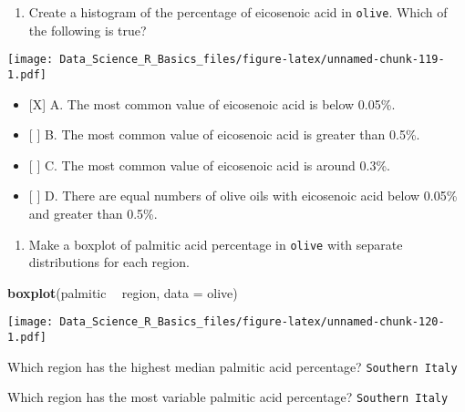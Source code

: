 \documentclass[]{article}
\newenvironment{Shaded}{\begin{snugshade}}{\end{snugshade}}
\newcommand{\DataTypeTok}[1]{\textcolor[rgb]{0.13,0.29,0.53}{#1}}
\newcommand{\KeywordTok}[1]{\textcolor[rgb]{0.13,0.29,0.53}{\textbf{#1}}}
\newcommand{\NormalTok}[1]{#1}
\newcommand{\OperatorTok}[1]{\textcolor[rgb]{0.81,0.36,0.00}{\textbf{#1}}}
\newcommand{\StringTok}[1]{\textcolor[rgb]{0.31,0.60,0.02}{#1}}
\providecommand{\tightlist}{%
  \setlength{\itemsep}{0pt}\setlength{\parskip}{0pt}}
\begin{document}
\begin{enumerate}
\def\labelenumi{\arabic{enumi}.}
\setcounter{enumi}{8}
\tightlist
\item
  Create a histogram of the percentage of eicosenoic acid in
  \texttt{olive}. Which of the following is true?
\end{enumerate}

\begin{Shaded}
\end{Shaded}

\texttt{[image: Data\_Science\_R\_Basics\_files/figure-latex/unnamed-chunk-119-1.pdf]}

\begin{itemize}
\tightlist
\item
  {[}X{]} A. The most common value of eicosenoic acid is below 0.05\%.
\item
  {[} {]} B. The most common value of eicosenoic acid is greater than
  0.5\%.
\item
  {[} {]} C. The most common value of eicosenoic acid is around 0.3\%.
\item
  {[} {]} D. There are equal numbers of olive oils with eicosenoic acid
  below 0.05\% and greater than 0.5\%.
\end{itemize}

\begin{enumerate}
\def\labelenumi{\arabic{enumi}.}
\setcounter{enumi}{9}
\tightlist
\item
  Make a boxplot of palmitic acid percentage in \texttt{olive} with
  separate distributions for each region.
\end{enumerate}

\begin{Shaded}
\begin{Highlighting}[]
\KeywordTok{boxplot}\NormalTok{(palmitic }\OperatorTok{~}\StringTok{ }\NormalTok{region, }\DataTypeTok{data =}\NormalTok{ olive)}
\end{Highlighting}
\end{Shaded}

\texttt{[image: Data\_Science\_R\_Basics\_files/figure-latex/unnamed-chunk-120-1.pdf]}

Which region has the highest median palmitic acid percentage?
\texttt{Southern\ Italy}

Which region has the most variable palmitic acid percentage?
\texttt{Southern\ Italy}
\end{document}
